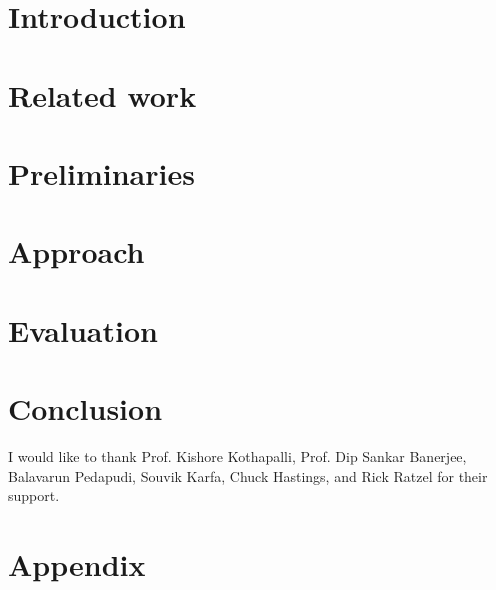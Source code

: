 \documentclass[sigconf,nonacm]{acmart}
\begin{document}






\maketitle

\section{Introduction}
\label{sec:introduction}


\section{Related work}
\label{sec:related}


\section{Preliminaries}
\label{sec:preliminaries}


\section{Approach}
\label{sec:approach}


\section{Evaluation}
\label{sec:evaluation}


\section{Conclusion}
\label{sec:conclusion}


\begin{acks}
I would like to thank Prof. Kishore Kothapalli,  Prof. Dip Sankar Banerjee, Balavarun Pedapudi, Souvik Karfa, Chuck Hastings, and Rick Ratzel for their support.
\end{acks}




\clearpage
\appendix
\section{Appendix}

\end{document}
